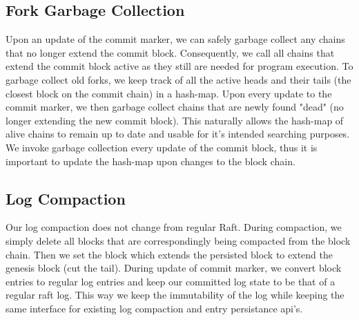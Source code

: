 \subsection{Fork Garbage Collection}
Upon an update of the commit marker, we can safely garbage collect any chains that no longer extend the commit block. 
Consequently, we call all chains that extend the commit block active as they still are needed for program execution. 
To garbage collect old forks, we keep track of all the active heads and their tails (the closest block on the commit chain) in a hash-map.
Upon every update to the commit marker, we then garbage collect chains that are newly found "dead" (no longer extending the new commit block).
This naturally allows the hash-map of alive chains to remain up to date and usable for it's intended searching purposes. 
We invoke garbage collection every update of the commit block, thus it is important to update the hash-map upon changes to the block chain.  

\subsection{Log Compaction}
Our log compaction does not change from regular Raft. During compaction, we simply delete all blocks that are correspondingly being compacted from the block chain.
Then we set the block which extends the persisted block to extend the genesis block (cut the tail).
During update of commit marker, we convert block entries to regular log entries and keep our committed log state to be that of a regular raft log. This way we keep the immutability of the log while keeping the same
interface for existing log compaction and entry persistance api's.